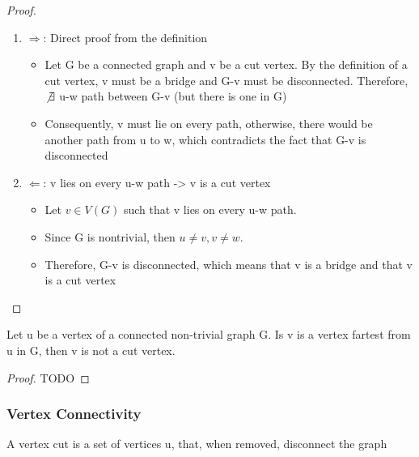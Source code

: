 \documentclass{article}
\begin{document}
\begin{proof}
    \begin{enumerate}
        \item $\Longrightarrow$: Direct proof from the definition
	    \begin{itemize}
	        \item Let G be a connected graph and v be a cut vertex. By the
		    definition of a cut vertex, v must be a bridge and G-v
		    must be disconnected. Therefore, $\not\exists$ u-w path
		    between G-v (but there is one in G)
		\item Consequently, v must lie on every path, otherwise, there
		    would be another path from u to w, which contradicts the
		    fact that G-v is disconnected
	    \end{itemize}
	\item $\Longleftarrow$: v lies on every u-w path -> v is a cut vertex
	    \begin{itemize}
		\item  Let $ v \in V(G)$ such that v lies on every u-w path.
		\item Since G is nontrivial, then $ u \neq v, v \neq w$.
		\item Therefore, G-v is disconnected, which means that v is
		    a bridge and that v is a cut vertex
	    \end{itemize}
    \end{enumerate}
\end{proof}

\begin{lemma}
\end{lemma}

\begin{theorem}
    Let u be a vertex of a connected non-trivial graph G. Is v is a vertex
    fartest from u in G, then v is not a cut vertex.
\end{theorem}

\begin{proof}
    TODO
\end{proof}

\subsubsection{Vertex Connectivity}

\begin{definition}
    A vertex cut is a set of vertices u, that, when removed, disconnect the
    graph
\end{definition}
\end{document}
